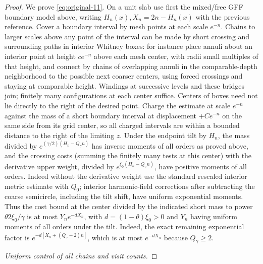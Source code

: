 \begin{proof}
We prove \eqref{eq:original-11}.
On a unit slab use first the mixed/free GFF boundary model above, writing \(H_n(x),X_n=2n-H_n(x)\) with the previous reference.
Cover a boundary interval by mesh points at each scale \(e^{-n}\).
Chains to larger scales above any point of the interval can be made by short crossing and surrounding paths in interior Whitney boxes: for instance place annuli about an interior point at height \(c e^{-n}\) above each mesh center, with radii small multiples of that height, and connect by chains of overlapping annuli in the comparable-depth neighborhood to the possible next coarser centers, using forced crossings and staying at comparable height.
Windings at successive levels and these bridges join; finitely many configurations at each center suffice.
Centers of boxes need not lie directly to the right of the desired point.
Charge the estimate at scale \(e^{-n}\) against the mass of a short boundary interval at displacement \(+C e^{-n}\) on the same side from its grid center, so all charged intervals are within a bounded distance to the right of the limiting \(z\).
Under the endpoint tilt by \(H_n\), the mass divided by \(e^{(\gamma/2)(H_n-Q_\gamma n)}\) has inverse moments of all orders as proved above, and the crossing costs (summing the finitely many tests at this center) with the derivative upper weight, divided by \(e^{\xi_0(H_n-Q_\gamma n)}\), have positive moments of all orders.
Indeed without the derivative weight use the standard rescaled interior metric estimate with \(Q_0\); interior harmonic-field corrections after subtracting the coarse semicircle, including the tilt shift, have uniform exponential moments.
Thus the cost bound at the center divided by the indicated short mass to power \(\theta 2\xi_0/\gamma\) is at most
$Y_n e^{-dX_n}$, with $d=(1-\theta)\xi_0>0$ and $Y_n$ having uniform moments of all orders under the tilt.  Indeed, the exact remaining exponential factor is $e^{-d[X_n+(Q_\gamma-2)n]}$, which is at most $e^{-dX_n}$ because $Q_\gamma\geq2$.

\smallskip\noindent\textit{Uniform control of all chains and visit counts.}\quad


\end{proof}
